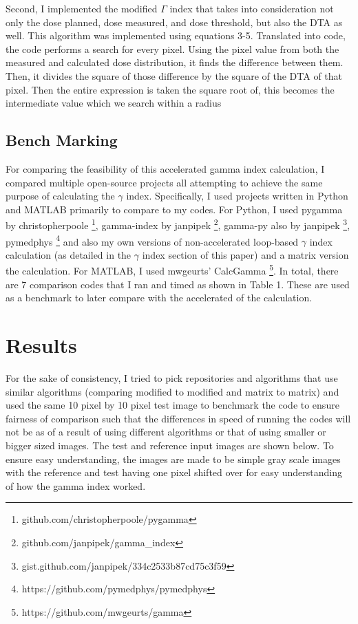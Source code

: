 \documentclass[12pt]{article}
\begin{document}
Second, I implemented the modified $\Gamma$ index that takes into consideration not only the dose planned, dose measured, and dose threshold, but also the DTA as well. This algorithm was implemented using equations 3-5. Translated into code, the code performs a search for every pixel. Using the pixel value from both the measured and calculated dose distribution, it finds the difference between them. Then, it divides the square of those difference by the square of the DTA of that pixel. Then the entire expression is taken the square root of, this becomes the intermediate value which we search within a radius

\subsection{Bench Marking}
For comparing the feasibility of this accelerated gamma index calculation, I compared multiple open-source projects all attempting to achieve the same purpose of calculating the $\gamma$ index. Specifically, I used projects written in Python and MATLAB primarily to compare to my codes. For Python, I used pygamma by christopherpoole \footnote[1]{github.com/christopherpoole/pygamma}, gamma-index by janpipek \footnote[2]{github.com/janpipek/gamma\_index}, gamma-py also by janpipek \footnote[3]{gist.github.com/janpipek/334c2533b87cd75c3f59}, pymedphys \footnote[5]{https://github.com/pymedphys/pymedphys} and also my own versions of non-accelerated loop-based $\gamma$ index calculation (as detailed in the $\gamma$ index section of this paper) and a matrix version the calculation. For MATLAB, I used mwgeurts' CalcGamma \footnote[5]{https://github.com/mwgeurts/gamma}. In total, there are 7 comparison codes that I ran and timed as shown in Table 1. These are used as a benchmark to later compare with the accelerated of the calculation.

\section{Results}
For the sake of consistency, I tried to pick repositories and algorithms that use similar algorithms (comparing modified to modified and matrix to matrix) and used the same 10 pixel by 10 pixel test image to benchmark the code to ensure fairness of comparison such that the differences in speed of running the codes will not be as of a result of using different algorithms or that of using smaller or bigger sized images. The test and reference input images are shown below. To ensure easy understanding, the images are made to be simple gray scale images with the reference and test having one pixel shifted over for easy understanding of how the gamma index worked.
\end{document}

